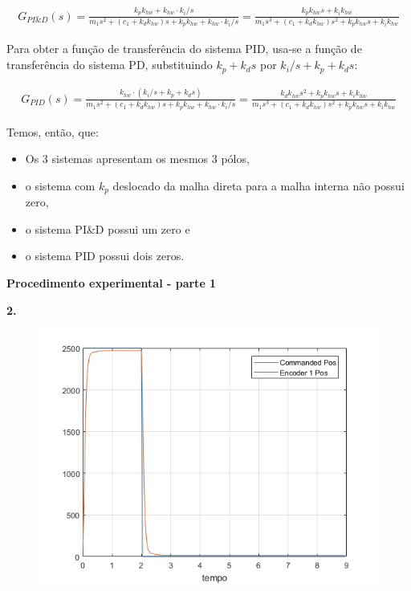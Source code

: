 \documentclass[a4paper,11pt]{article}
\begin{document}
\begin{gather*}
    G_{PI\&D}\left(s\right) = \frac{k_p k_{hw} + k_{hw} \cdot k_i/s}
        {m_1 s^2 + \left(c_1 + k_d k_{hw}\right) s + k_p k_{hw} +
        k_{hw} \cdot k_i/s} = \frac{k_p k_{hw} s + k_i k_{hw}}
        {m_1 s^3 + \left(c_1 + k_d k_{hw}\right) s^2 + k_p k_{hw} s +
        k_i k_{hw}}
\end{gather*}

Para obter a função de transferência do sistema PID, usa-se a função de
transferência do sistema PD, substituindo $k_p + k_d s$ por
$k_i/s + k_p + k_d s$:

\begin{gather*}
    G_{PID}\left(s\right) = \frac{k_{hw} \cdot \left(k_i/s + k_p + k_d s\right)}
        {m_1 s^2 + \left(c_1 + k_d k_{hw}\right) s + k_p k_{hw} + k_{hw} \cdot
        k_i/s} = \frac{k_d k_{hw} s^2 + k_p k_{hw} s + k_i k_{hw}}
        {m_1 s^3 + \left(c_1 + k_d k_{hw}\right) s^2 + k_p k_{hw} s +
        k_i k_{hw}}
\end{gather*}

Temos, então, que:

\begin{itemize}
  \item Os 3 sistemas apresentam os mesmos 3 pólos,
  \item o sistema com $k_p$ deslocado da malha direta para a malha interna
    não possui zero,
  \item o sistema PI\&D possui um zero e
  \item o sistema PID possui dois zeros.
\end{itemize}

\pagebreak

\textbf{Procedimento experimental - parte 1}

\textbf{2.}

\begin{figure}[H]
\includegraphics{q02}
\centering
\end{figure}
\end{document}
